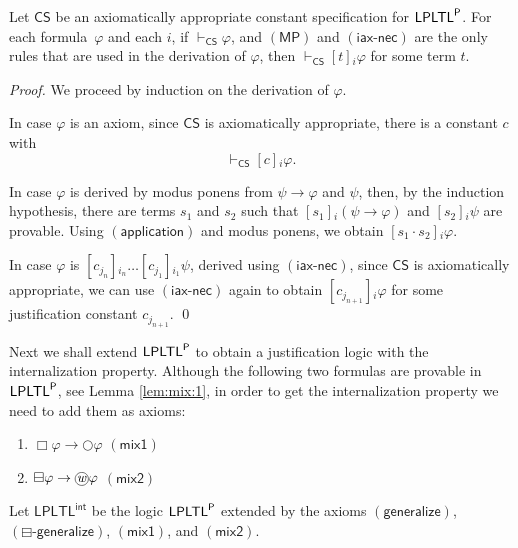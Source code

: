 \documentclass[envcountsect,envcountsame,oribibl,orivec]{llncs}
\newcommand*\circled[1]{\tikz[baseline=(char.base)]{
		\node[shape=circle,draw,inner sep=0.4pt] (char) {#1};}}
\newcommand{\mprule}{\ensuremath{(\textsf{MP})}}
\newcommand{\limplies}{\rightarrow}
\newcommand{\lnext}{\bigcirc}
\newcommand{\lalways}{\Box}
\newcommand{\lsofar}{\boxminus}
\newcommand{\wprevious}{\circled{\textit{w}}}
\newcommand{\mixaxone}{\ensuremath{(\textsf{mix1})}}
\newcommand{\mixaxtwo}{\ensuremath{(\textsf{mix2})}}
\newcommand{\necrule}{\ensuremath{\textsf{-nec}}}
\newcommand{\LPLTLp}{\textsf{LPLTL}^{\sf P}}
\newcommand{\LPLTL}{\textsf{LPLTL}}
\newcommand{\jbox}[1]{\left[#1\right]\!}
\newcommand{\tapp}{\cdot}
\newcommand{\appax}{\ensuremath{(\textsf{application})}}
\newcommand{\iteratedconstnecrule}{\ensuremath{(\textsf{iax}\necrule)}}
\newcommand{\CS}{\textsf{CS}}
\newcommand{\agent}{i}
\newcommand{\generalizeprinciple}{\ensuremath{(\textsf{generalize})}}
\newcommand{\pastgeneralizeprinciple}{\ensuremath{(\lsofar\textsf{-generalize})}}
\renewcommand{\phi}{\varphi}
\begin{document}
\begin{lemma}\label{lem: internalization LPLTLp}
	Let\/ $\CS$ be an axiomatically appropriate constant specification for $\LPLTLp$. For each formula~$\phi$ and each  $\agent$, if $\vdash_\CS \phi$, and $\mprule$ and $\iteratedconstnecrule$ are the only rules that are used in the derivation of $\phi$, then $\vdash_\CS  \jbox{t}_\agent \phi$  for some term $t$.
\end{lemma}
\begin{proof}
	We proceed by induction on the derivation of $\phi$.
	
	In case $\phi$ is an axiom, since $\CS$ is axiomatically appropriate, there is a constant $c$ with
	\[
	 \vdash_\CS \jbox{c}_\agent \phi.
	\]
	
	In case $\phi$ is derived by modus ponens from $\psi \limplies \phi$ and $\psi$, then, by the induction hypothesis, there are terms $s_1$ and $s_2$ such that $\jbox{s_1}_\agent (\psi \limplies \phi)$ and $\jbox{s_2}_\agent \psi$ are provable.
	Using $\appax$ and modus ponens, we obtain $\jbox{s_1 \tapp s_2}_\agent \phi$. 
	
	In case $\phi$ is $\jbox{c_{j_n}}_{i_n}\ldots\jbox{c_{j_1}}_{i_1} \psi$, derived using \iteratedconstnecrule, since $\CS$ is axiomatically appropriate, we can use $\iteratedconstnecrule$ again to obtain 
	$\jbox{c_{j_{n+1}}}_{\agent} \phi$ for some justification constant $c_{j_{n+1}}$. \qed
\end{proof}
	

Next we shall extend $\LPLTLp$ to obtain a justification logic with the internalization property. Although the following two formulas are provable in $\LPLTLp$, see Lemma \ref{lem:mix:1}, in order to get the internalization property we need to add them as axioms:

\begin{enumerate}
	\item $\lalways \phi \to \lnext \phi$ \hfill \mixaxone
	\item $\lsofar \phi \to \wprevious \phi$ \hfill \mixaxtwo
\end{enumerate}

Let  $\LPLTL^\mathsf{int}$ be the logic $\LPLTLp$ extended by the axioms $\generalizeprinciple$,\linebreak $\pastgeneralizeprinciple$, $\mixaxone$, and $\mixaxtwo$. 
\end{document}
